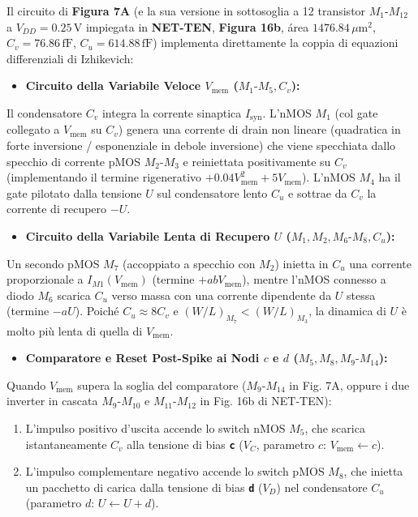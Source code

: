 \documentclass[11pt,a4paper]{article}
\begin{document}
Il circuito di \textbf{Figura 7A} (e la sua versione in sottosoglia a 12 transistor $M_1\text{-}M_{12}$ a $V_{DD}=0.25\,\text{V}$ impiegata in \textbf{NET-TEN}, \textbf{Figura 16b}, área $1476.84\,\mu\text{m}^2$, $C_v = 76.86\,\text{fF}$, $C_u = 614.88\,\text{fF}$) implementa direttamente la coppia di equazioni differenziali di Izhikevich:
\begin{itemize}
  \item \textbf{Circuito della Variabile Veloce $V_{\text{mem}}$ ($M_1\text{-}M_5, C_v$):}
\end{itemize}
Il condensatore $C_v$ integra la corrente sinaptica $I_{\text{syn}}$. L'nMOS \textbf{$M_1$} (col gate collegato a $V_{\text{mem}}$ su $C_v$) genera una corrente di drain non lineare (quadratica in forte inversione / esponenziale in debole inversione) che viene specchiata dallo specchio di corrente pMOS \textbf{$M_2\text{-}M_3$} e reiniettata positivamente su $C_v$ (implementando il termine rigenerativo $+0.04 V_{\text{mem}}^2 + 5V_{\text{mem}}$). L'nMOS \textbf{$M_4$} ha il gate pilotato dalla tensione $U$ sul condensatore lento $C_u$ e sottrae da $C_v$ la corrente di recupero $-U$.
\begin{itemize}
  \item \textbf{Circuito della Variabile Lenta di Recupero $U$ ($M_1, M_2, M_6\text{-}M_8, C_u$):}
\end{itemize}
Un secondo pMOS \textbf{$M_7$} (accoppiato a specchio con $M_2$) inietta in $C_u$ una corrente proporzionale a $I_{M1}(V_{\text{mem}})$ (termine $+a b V_{\text{mem}}$), mentre l'nMOS connesso a diodo \textbf{$M_6$} scarica $C_u$ verso massa con una corrente dipendente da $U$ stessa (termine $-a U$). Poiché $C_u \approx 8 C_v$ e $(W/L)_{M_7} < (W/L)_{M_3}$, la dinamica di $U$ è molto più lenta di quella di $V_{\text{mem}}$.
\begin{itemize}
  \item \textbf{Comparatore e Reset Post-Spike ai Nodi $c$ e $d$ ($M_5, M_8, M_9\text{-}M_{14}$):}
\end{itemize}
Quando $V_{\text{mem}}$ supera la soglia del comparatore ($M_9\text{-}M_{14}$ in Fig. 7A, oppure i due inverter in cascata $M_9\text{-}M_{10}$ e $M_{11}\text{-}M_{12}$ in Fig. 16b di NET-TEN):
\begin{enumerate}
  \item L'impulso positivo d'uscita accende lo switch nMOS \textbf{$M_5$}, che scarica istantaneamente $C_v$ alla tensione di bias \textbf{\texttt{c}} ($V_C$, parametro $c$: $V_{\text{mem}} \leftarrow c$).
  \item L'impulso complementare negativo accende lo switch pMOS \textbf{$M_8$}, che inietta un pacchetto di carica dalla tensione di bias \textbf{\texttt{d}} ($V_D$) nel condensatore $C_u$ (parametro $d$: $U \leftarrow U + d$).
\end{enumerate}
\end{document}
